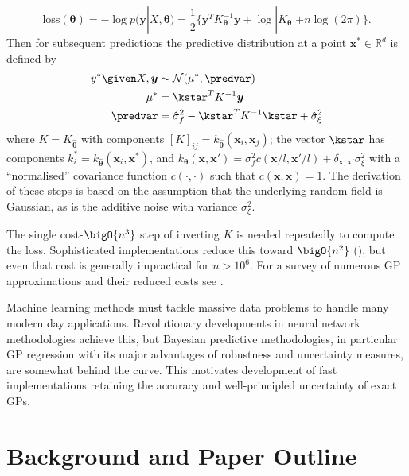 \begin{equation}
  \mbox{loss}(\bm{\theta}) = -\log p(\bm{y}|X,\bm{\theta}) = \frac{1}{2}\{ \bm{y}^T K_{\bm{\theta}}^{-1} \bm{y} + \log|K_{\bm{\theta}}| + n \log(2 \pi) \}.\label{eq:gp_los_func}
\end{equation}
Then for subsequent predictions the predictive distribution at a point $\bm{x}^* \in \mathbb{R}^d$ is defined by 
\begin{align}
  y^*\given X,\bm{y} &\sim \mathcal{N}(\mu^*,\predvar) \label{eq:gp_pred}\\
  \mu^* &= {\kstar}^T K ^{-1}\bm{y} \label{eq:gp_mean_pred}\\
  \predvar &= \hat{\sigma}_f^2 - {\kstar}^T K^{-1}\kstar + \hat{\sigma}_\xi^2 \label{eq:gp_var_pred}
\end{align}
where $K = K_{\hat{\bm{\theta}}}$ with components \([K]_{ij}=k_{\hat{\bm{\theta}}}(\bm{x}_i,\bm{x}_j)\); the vector $\kstar$ has components $k^*_i= k_{\hat{\bm{\theta}}}(\bm{x}_i,\bm{x}^*)$, and \(k_{\bm{\theta}}(\bm{x},\bm{x}') = \sigma_f^2c(\bm{x}/l,\bm{x}'/l) + \delta_{\bm{x},\bm{x}'}\sigma_\xi^2\) with a ``normalised'' covariance function \(c(\cdot,\cdot)\) such that \(c(\bm{x},\bm{x})=1\). The derivation of these steps is based on the assumption that the underlying random field is Gaussian, as is the additive noise with variance $\sigma_\xi^2$.

The single cost-$\bigO{n^3}$ step of inverting $K$ is needed repeatedly to compute the loss. Sophisticated implementations reduce this toward $\bigO{n^2}$ (\cite{exact_big_GP}), but even that cost is generally impractical for $n > 10^6$. For a survey of numerous GP approximations and their reduced costs see \cite{GP_approx_review}. 

Machine learning methods must tackle massive data problems to handle many modern day applications. Revolutionary developments in neural network methodologies achieve this, but Bayesian predictive methodologies, in particular GP regression with its major advantages of robustness and uncertainty measures, are somewhat behind the curve. This motivates development of fast implementations retaining the accuracy and well-principled uncertainty of exact GPs.

 
\section{Background and Paper Outline}


